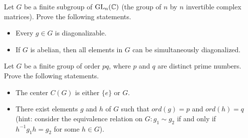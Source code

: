 \begin{exercise}
    Let $G$ be a finite subgroup of $\mathrm{GL}_n({\mathbb{C}})$ (the group of $n$ by $n$ invertible complex matrices).
Prove the following statements.
\begin{itemize}
    \item Every $g \in G$ is diagonalizable.
    \item  If $G$ is abelian, then all elements in $G$ can be simultaneously diagonalized.
\end{itemize}
\end{exercise}

\begin{exercise}
    Let $G$ be a finite group of order $pq$, where $p$ and $q$ are distinct prime numbers. Prove the
following statements.
\begin{itemize}
    \item The center $C(G)$ is either $\{e\}$ or $G$.
    \item  There exist elements $g$ and $h$ of $G$ such that $ord(g) = p$ and $ord(h) = q$ (hint:
    consider the equivalence relation on $G: g_1 \sim g_2$ if and only if $h^{-1} g_{1} h=g_{2}$ for some
    $h \in G$).
\end{itemize}
\end{exercise}